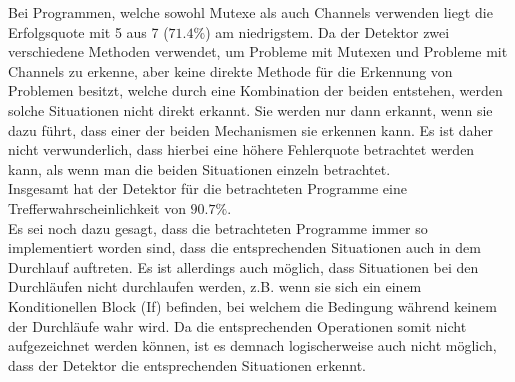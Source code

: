 Bei Programmen, welche sowohl Mutexe als auch Channels verwenden liegt 
die Erfolgsquote mit 5 aus 7 ($71.4\%$) am niedrigstem. Da der Detektor 
zwei verschiedene Methoden verwendet, um Probleme mit Mutexen und Probleme 
mit Channels zu erkenne, aber keine direkte Methode für die Erkennung
von Problemen besitzt, welche durch eine Kombination der beiden entstehen, 
werden solche Situationen nicht direkt erkannt. Sie werden nur dann erkannt, 
wenn sie dazu führt, dass einer der beiden Mechanismen sie erkennen 
kann. Es ist daher nicht verwunderlich, dass hierbei eine höhere Fehlerquote 
betrachtet werden kann, als wenn man die beiden Situationen einzeln
betrachtet.\\
Insgesamt hat der Detektor für die betrachteten Programme eine 
Trefferwahrscheinlichkeit von $90.7\%$. \\
Es sei noch dazu gesagt, dass die betrachteten Programme immer so implementiert 
worden sind, dass die entsprechenden Situationen auch in dem Durchlauf 
auftreten. Es ist allerdings auch möglich, dass Situationen bei den Durchläufen 
nicht durchlaufen werden, z.B. wenn sie sich ein einem Konditionellen 
Block (If) befinden, bei welchem die Bedingung während keinem der Durchläufe 
wahr wird. Da die entsprechenden Operationen somit nicht aufgezeichnet 
werden können, ist es demnach logischerweise auch nicht möglich, dass der 
Detektor die entsprechenden Situationen erkennt.




